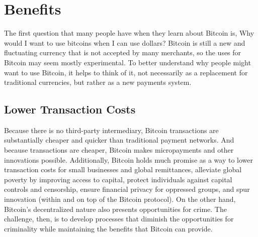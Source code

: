 \section{Benefits}

The first question that many people have when they learn
about Bitcoin is, Why would I want to use bitcoins when I can
use dollars? Bitcoin is still a new and fluctuating currency that
is not accepted by many merchants, so the uses for Bitcoin may
seem mostly experimental. To better understand why people
might want to use Bitcoin, it helps to think of it, not necessarily
as a replacement for traditional currencies, but rather as a new
payments system.

\subsection{Lower Transaction Costs}

Because there is no third-party intermediary, Bitcoin transactions
are substantially cheaper and quicker than traditional payment
networks. And because transactions are cheaper, Bitcoin makes
micropayments and other innovations possible. Additionally,
Bitcoin holds much promise as a way to lower transaction costs
for small businesses and global remittances, alleviate global poverty
by improving access to capital, protect individuals against
capital controls and censorship, ensure financial privacy for
oppressed groups, and spur innovation (within and on top of the
Bitcoin protocol). On the other hand, Bitcoin’s decentralized
nature also presents opportunities for crime. The challenge, then,
is to develop processes that diminish the opportunities for criminality
while maintaining the benefits that Bitcoin can provide.


